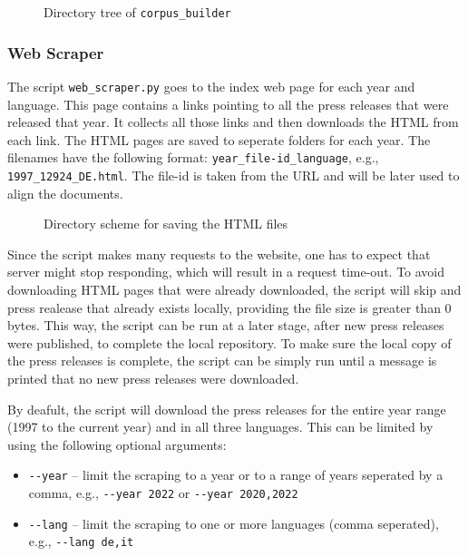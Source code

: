 \begin{figure}

\caption{Directory tree of \texttt{corpus\_builder}}
\end{figure} 
\subsubsection{Web Scraper}
\label{subsubsec:web-scraper}
The script \texttt{web\_scraper.py} goes to the index web page for each year and language. 
This page contains a links pointing to all the press releases that were released that year. 
It collects all those links and then downloads the HTML from each link. 
The HTML pages are saved to seperate folders for each year. 
The filenames have the following format: \texttt{year\_file-id\_language}, e.g., \texttt{1997\_12924\_DE.html}. 
The file-id is taken from the URL and will be later used to align the documents. 


\begin{figure}
\caption{Directory scheme for saving the HTML files}
\label{fig:html-scheme}
\end{figure} 

Since the script makes many requests to the website, one has to expect that server might stop responding, which will result in a request time-out. 
To avoid downloading HTML pages that were already downloaded, the script will skip and press realease that already exists locally, providing the file size is greater than 0 bytes.
This way, the script can be run at a later stage, after new press releases were published, to complete the local repository.
To make sure the local copy of the press releases is complete, the script can be simply run until a message is printed that no new press releases were downloaded. 

By deafult, the script will download the press releases for the entire year range (1997 to the current year) and in all three languages. 
This can be limited by using the following optional arguments:
\begin{itemize}
	\item \texttt{-{}-year} -- limit the scraping to a year or to a range of years seperated by a comma, e.g., \texttt{-{}-year 2022} or \texttt{-{}-year 2020,2022}
	\item \texttt{-{}-lang} -- limit the scraping to one or more languages (comma seperated), e.g., \texttt{-{}-lang de,it}
\end{itemize}

